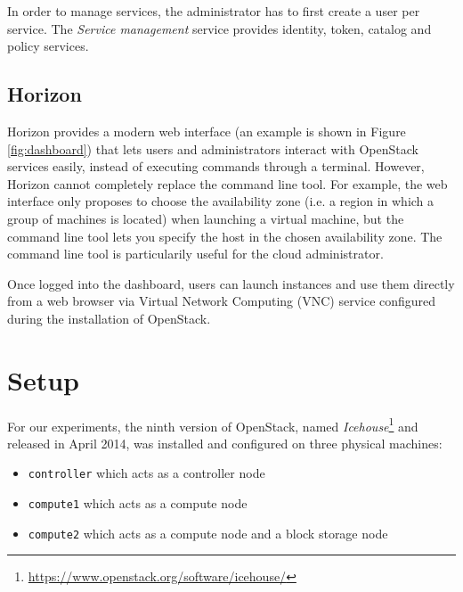 In order to manage services, the administrator has to first create a user per service. 
The \textit{Service management} service provides identity, token, catalog and policy services.



\subsection{Horizon}
Horizon provides a modern web interface (an example is shown in Figure \ref{fig:dashboard}) that lets users and administrators interact with OpenStack services easily, instead of executing commands through a terminal. 
However, Horizon cannot completely replace the command line tool. For example, the web interface only proposes to choose the availability zone (i.e. a region in which a group of machines is located) when launching a virtual machine, but the command line tool lets you specify the host in the chosen availability zone.
The command line tool is particularily useful for the cloud administrator.

Once logged into the dashboard, users can launch instances and use them directly from a web browser via Virtual Network Computing (VNC) service configured during the installation of OpenStack.




\section{Setup}
\label{section_setup}
For our experiments, the ninth version of OpenStack, named \textit{Icehouse}\footnote{\url{https://www.openstack.org/software/icehouse/}} and released in April 2014, was installed and configured on three physical machines:

{
\singlespacing
\begin{itemize}
	\item{\texttt{controller} which acts as a controller node}
	\item{\texttt{compute1} which acts as a compute node}
	\item{\texttt{compute2} which acts as a compute node and a block storage node}
\end{itemize}
}

